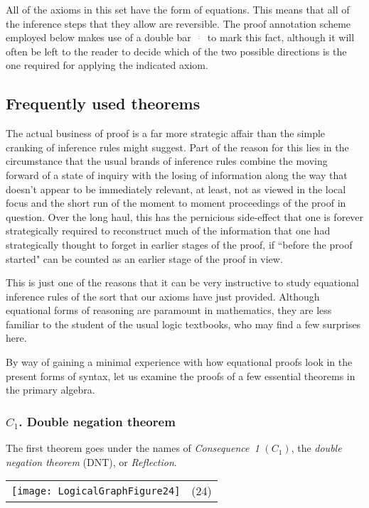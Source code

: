 \documentclass[12pt]{article}
\begin{document}
All of the axioms in this set have the form of equations.  This means that all of the inference steps that they allow are reversible.  The proof annotation scheme employed below makes use of a double bar $^{\underline{\overline{~~~~~~}}}$ to mark this fact, although it will often be left to the reader to decide which of the two possible directions is the one required for applying the indicated axiom.

\subsection{Frequently used theorems}

The actual business of proof is a far more strategic affair than the simple cranking of inference rules might suggest.  Part of the reason for this lies in the circumstance that the usual brands of inference rules combine the moving forward of a state of inquiry with the losing of information along the way that doesn't appear to be immediately relevant, at least, not as viewed in the local focus and the short run of the moment to moment proceedings of the proof in question.  Over the long haul, this has the pernicious side-effect that one is forever strategically required to reconstruct much of the information that one had strategically thought to forget in earlier stages of the proof, if ``before the proof started" can be counted as an earlier stage of the proof in view.

This is just one of the reasons that it can be very instructive to study equational inference rules of the sort that our axioms have just provided.  Although equational forms of reasoning are paramount in mathematics, they are less familiar to the student of the usual logic textbooks, who may find a few surprises here.

By way of gaining a minimal experience with how equational proofs look in the present forms of syntax, let us examine the proofs of a few essential theorems in the primary algebra.

\subsubsection{$C_1$.  Double negation theorem}

The first theorem goes under the names of \textit{Consequence~1} $(C_1)$, the \textit{double negation theorem} (DNT), or \textit{Reflection}.

\begin{center}\begin{tabular}{cc}
\texttt{[image: LogicalGraphFigure24]} & (24)
\end{tabular}\end{center}
\end{document}
